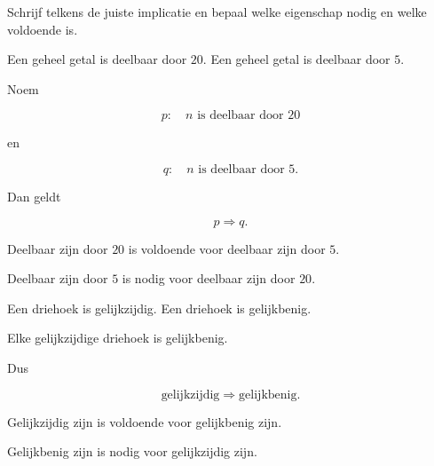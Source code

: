 \documentclass{ximera}
\begin{document}

\begin{oefening}{\oefU\ESS}

Schrijf telkens de juiste implicatie en bepaal welke eigenschap nodig
en welke voldoende is.

\begin{question}

Een geheel getal is deelbaar door $20$.
Een geheel getal is deelbaar door $5$.

\begin{oplossing}

Noem

\[
p:\quad n\text{ is deelbaar door }20
\]

en

\[
q:\quad n\text{ is deelbaar door }5.
\]

Dan geldt

\[
p\Rightarrow q.
\]

Deelbaar zijn door $20$ is voldoende voor deelbaar zijn door $5$.

Deelbaar zijn door $5$ is nodig voor deelbaar zijn door $20$.

\end{oplossing}

\end{question}


\begin{question}

Een driehoek is gelijkzijdig.
Een driehoek is gelijkbenig.

\begin{oplossing}

Elke gelijkzijdige driehoek is gelijkbenig.

Dus

\[
\text{gelijkzijdig}\Rightarrow\text{gelijkbenig}.
\]

Gelijkzijdig zijn is voldoende voor gelijkbenig zijn.

Gelijkbenig zijn is nodig voor gelijkzijdig zijn.

\end{oplossing}

\end{question}

\end{oefening}
\end{document}

